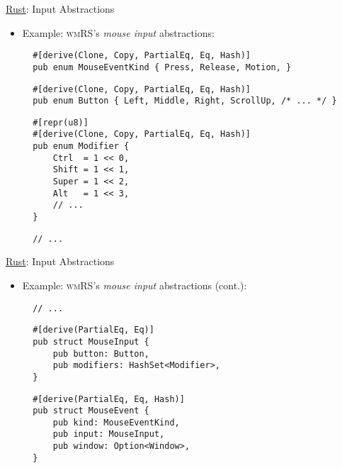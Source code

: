 \begin{frame}[fragile]{\underline{Rust}: Input Abstractions \hfill {\footnotesize \currentname}}


    \begin{itemize}

        \item Example: \textsc{wmRS}'s \textit{mouse input} abstractions:\\[3pt]
\begin{verbatim}
  #[derive(Clone, Copy, PartialEq, Eq, Hash)]
  pub enum MouseEventKind { Press, Release, Motion, }
\end{verbatim}
\begin{verbatim}
  #[derive(Clone, Copy, PartialEq, Eq, Hash)]
  pub enum Button { Left, Middle, Right, ScrollUp, /* ... */ }
\end{verbatim}
\begin{verbatim}
  #[repr(u8)]
  #[derive(Clone, Copy, PartialEq, Eq, Hash)]
  pub enum Modifier {
      Ctrl  = 1 << 0,
      Shift = 1 << 1,
      Super = 1 << 2,
      Alt   = 1 << 3,
      // ...
  }
\end{verbatim}
\begin{verbatim}
  // ...
\end{verbatim}

    \end{itemize}

    \vfill

\end{frame}

\begin{frame}[fragile]{\underline{Rust}: Input Abstractions \hfill {\footnotesize \currentname}}


    \begin{itemize}

        \item Example: \textsc{wmRS}'s \textit{mouse input} abstractions (cont.):\\[3pt]
\begin{verbatim}
  // ...
\end{verbatim}
\begin{verbatim}
  #[derive(PartialEq, Eq)]
  pub struct MouseInput {
      pub button: Button,
      pub modifiers: HashSet<Modifier>,
  }
\end{verbatim}
\begin{verbatim}
  #[derive(PartialEq, Eq, Hash)]
  pub struct MouseEvent {
      pub kind: MouseEventKind,
      pub input: MouseInput,
      pub window: Option<Window>,
  }
\end{verbatim}

    \end{itemize}

    \vfill

\end{frame}

